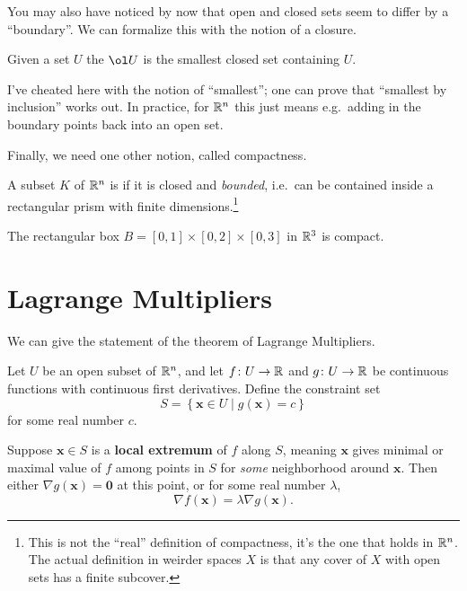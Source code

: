 \documentclass[11pt]{scrartcl}
\begin{document}
You may also have noticed by now that open and closed sets seem to differ
by a ``boundary''. We can formalize this with the notion of a closure.
\begin{definition}
  Given a set $U$ the  $\ol U$ is the smallest closed set containing $U$.
\end{definition}
I've cheated here with the notion of ``smallest'';
one can prove that ``smallest by inclusion'' works out.
In practice, for $\mathbb R^n$ this just means {e.g.}\
adding in the boundary points back into an open set.


Finally, we need one other notion, called compactness.
\begin{definition}
  A subset $K$ of $\mathbb R^n$ is 
  if it is closed and \emph{bounded},
  i.e.\ can be contained inside a rectangular prism
  with finite dimensions.\footnote{This
    is not the ``real'' definition of compactness,
    it's the one that holds in $\mathbb R^n$.
    The actual definition in weirder spaces $X$ is that
    any cover of $X$ with open sets has a finite subcover.}
\end{definition}

\begin{example}
  The rectangular box
  $B = [0,1] \times [0,2] \times [0,3]$ in $\mathbb R^3$
  is compact.
\end{example}

\section{Lagrange Multipliers}
We can give the statement of the theorem of Lagrange Multipliers.

\begin{theorem}
  Let $U$ be an open subset of $\mathbb R^n$, and let $f \colon U \to \mathbb R$
  and $g \colon U \to \mathbb R$ be continuous functions with continuous first derivatives.
  Define the constraint set
  \[ S = \left\{ \mathbf{x} \in U \mid g(\mathbf{x}) = c \right\} \]
  for some real number $c$.

  Suppose $\mathbf{x} \in S$ is a \textbf{local extremum} of $f$ along $S$,
  meaning $\mathbf{x}$ gives minimal or maximal value
  of $f$ among points in $S$ for \emph{some} neighborhood around $\mathbf{x}$.
  Then either $\nabla g(\mathbf{x}) = \mathbf{0}$ at this point,
  or for some real number $\lambda$,
  \[ \nabla f(\mathbf{x}) = \lambda \nabla g(\mathbf{x}). \]
\end{theorem}
\end{document}
